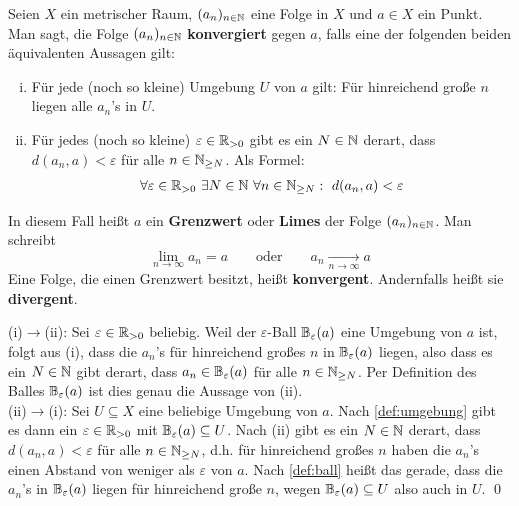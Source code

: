 \begin{de}[Folgenkonvergenz] \label{def:konvergenz}    
    Seien $X$ ein metrischer Raum, $(a_n)_{n\in \mathbb N}$ eine Folge in $X$ und $a\in X$ ein Punkt. Man sagt, die Folge $(a_n)_{n\in \mathbb N}$ \textbf{konvergiert} gegen $a$, falls eine der folgenden beiden äquivalenten Aussagen gilt:
    \begin{enumerate}[(i)]
        \item Für jede (noch so kleine) Umgebung $U$ von $a$ gilt: Für hinreichend große $n$ liegen alle $a_n$'s in $U$.
        \item Für jedes (noch so kleine) $\varepsilon \in \mathbb R_{>0}$ gibt es ein $N\in \mathbb N$ derart, dass $d(a_n,a)<\varepsilon$ für alle $n\in \mathbb N_{\ge N}$. Als Formel:
        \begin{align*}
            \forall\varepsilon\in \mathbb R_{>0}\ \exists N\in\mathbb N\ \forall n\in \mathbb N_{\ge N}:\ d(a_n,a)<\varepsilon
        \end{align*}
    \end{enumerate}
    In diesem Fall heißt $a$ ein \textbf{Grenzwert} oder \textbf{Limes} der Folge $(a_n)_{n\in \mathbb N}$. Man schreibt
        \[ \lim_{n\to\infty}a_n=a \qquad\text{oder}\qquad a_n\xrightarrow[n\to \infty]{} a \]
    Eine Folge, die einen Grenzwert besitzt, heißt \textbf{konvergent}. Andernfalls heißt sie \textbf{divergent}.
\end{de}


\begin{bew}[*]
    (i)$\to$(ii): Sei $\varepsilon\in \mathbb R_{> 0}$ beliebig. Weil der $\varepsilon$-Ball $\mathbb B_\varepsilon(a)$ eine Umgebung von $a$ ist, folgt aus (i), dass die $a_n$'s für hinreichend großes $n$ in $\mathbb B_\varepsilon(a)$ liegen, also dass es ein $N\in \mathbb N$ gibt derart, dass $a_n\in \mathbb B_\varepsilon(a)$ für alle $n\in \mathbb N_{\ge N}$. Per Definition des Balles $\mathbb B_\varepsilon(a)$ ist dies genau die Aussage von (ii). \\[0.5em]
    (ii)$\to$(i): Sei $U\subseteq X$ eine beliebige Umgebung von $a$. Nach \cref{def:umgebung} gibt es dann ein $\varepsilon\in \mathbb R_{>0}$ mit $\mathbb B_\varepsilon(a)\subseteq U$. Nach (ii) gibt es ein $N\in \mathbb N$ derart, dass $d(a_n,a)<\varepsilon$ für alle $n\in \mathbb N_{\ge N}$, d.h. für hinreichend großes $n$ haben die $a_n$'s einen Abstand von weniger als $\varepsilon$ von $a$. Nach \cref{def:ball} heißt das gerade, dass die $a_n$'s in $\mathbb B_\varepsilon(a)$ liegen für hinreichend große $n$, wegen $\mathbb B_\varepsilon(a)\subseteq U$ also auch in $U$. \qed
\end{bew}



